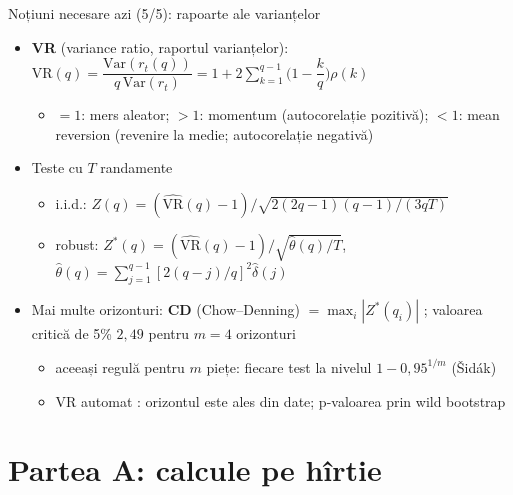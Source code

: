 \begin{frame}{Noțiuni necesare azi (5/5): rapoarte ale varianțelor}
\itemsize{\small}
\begin{itemize}
    \item \textbf{VR} (variance ratio, raportul varianțelor): $\mathrm{VR}(q) = \dfrac{\mathrm{Var}(r_t(q))}{q\,\mathrm{Var}(r_t)} = 1 + 2\sum_{k=1}^{q-1}\Big(1 - \dfrac{k}{q}\Big)\rho(k)$ 
    \begin{itemize}
        \item $= 1$: mers aleator; $> 1$: momentum (autocorelație pozitivă); $< 1$: mean reversion (revenire la medie; autocorelație negativă)
    \end{itemize}
    \item Teste cu $T$ randamente
    \begin{itemize}
        \item i.i.d.: $Z(q) = (\widehat{\mathrm{VR}}(q) - 1)\big/\sqrt{2(2q-1)(q-1)/(3qT)}$
        \item robust: $Z^*(q) = (\widehat{\mathrm{VR}}(q) - 1)\big/\sqrt{\hat\theta(q)/T}$, $\hat\theta(q) = \sum_{j=1}^{q-1}[2(q-j)/q]^2\hat\delta(j)$
    \end{itemize}
    \item Mai multe orizonturi: \textbf{CD} (Chow--Denning) $= \max_i|Z^*(q_i)|$ ; valoarea critică de 5\% $2{,}49$ pentru $m = 4$ orizonturi
    \begin{itemize}
        \item aceeași regulă pentru $m$ piețe: fiecare test la nivelul $1 - 0{,}95^{1/m}$ (Šidák)
        \item VR automat : orizontul este ales din date; p-valoarea prin wild bootstrap 
    \end{itemize}
\end{itemize}
\end{frame}


\section{Partea A: calcule pe hîrtie}

